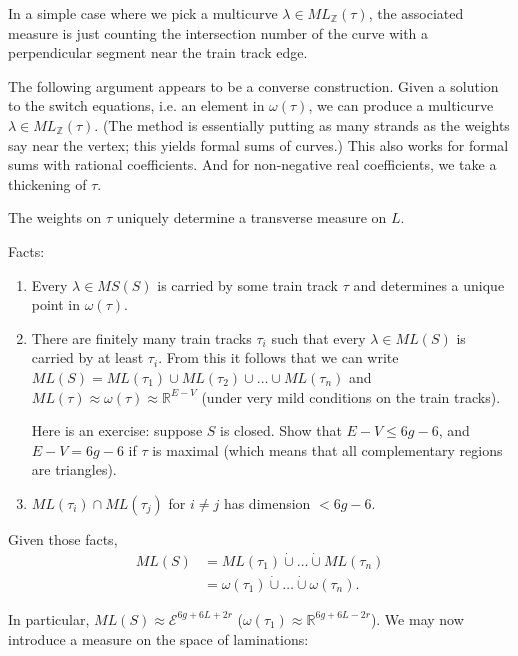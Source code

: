 \noindent
In a simple case where we pick a multicurve
$\lambda \in ML_{\mathbb{Z}}(\tau)$, the
associated measure
is just counting the intersection number
of the curve with a perpendicular segment
near
the train track edge.

The following argument appears to be a
converse construction.
Given a solution to the switch equations,
i.e. an element in $\omega(\tau)$, we can
produce
a multicurve $\lambda \in
ML_{\mathbb{Z}}(\tau)$.
(The method is essentially putting as many
strands
as the weights say near the vertex;
this yields formal sums of curves.)
This also works for formal sums with rational
coefficients.
And for non-negative real coefficients, we
take a thickening of $\tau$.

\begin{theorem}[Thurston]
\label{theorem-thurston-train-tracks}
The weights on $\tau$ uniquely determine a
transverse measure on $L$.
\end{theorem}

\medskip\noindent
Facts:
\begin{enumerate}
\item Every $\lambda \in MS(S)$
is carried by some train track $\tau$ and
determines
a unique point in $\omega(\tau)$.
\item There are finitely many train tracks
$\tau_i$ such that
every $\lambda \in ML(S)$ is carried by at
least $\tau_i$.
From this it follows that we can write
$ML(S)=ML(\tau_1)\cup  ML(\tau_2)\cup
\ldots\cup ML(\tau_n)$
and $ML(\tau)\approx \omega(\tau)\approx
\mathbb{R}^{E-V}$
(under very mild conditions on the train
tracks).

Here is an exercise: suppose $S$ is closed.
Show that $E-V \leq  6g-6$, and
$E-V=6g-6$ if $\tau$ is maximal (which means
that all complementary
regions are triangles).

\item $ML(\tau_i)\cap ML(\tau_j)$ for $i \neq
j$ has dimension
$<6g-6$.
\end{enumerate}

Given those facts,
$$
\begin{aligned}
ML(S)&=ML(\tau_1)\dot\cup \ldots \dot\cup
ML(\tau_n)\\
&=\omega(\tau_1)\dot\cup \ldots\dot\cup
\omega(\tau_n).
\end{aligned}
$$

\noindent
In particular, $ML(S)\approx
\mathcal{E}^{6g+6L+2r}$
($\omega(\tau_1)\approx\mathbb{R}^{6g+6L-2r}
$).
We may now introduce a measure on the space
of laminations:

